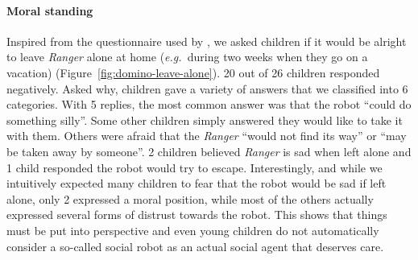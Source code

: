 \documentclass[letterpaper, 10pt, conference]{ieeeconf}
\newcommand{\eg}{{\textit{e.g.~}}}
\begin{document}
%

\vspace{1em}
\paragraph{Moral standing}

Inspired from the questionnaire used by \cite{kahn_jr._robotic_2006}, we asked
children if it would be alright to leave \emph{Ranger} alone at home (\eg during two
weeks when they go on a vacation) (Figure~\ref{fig:domino-leave-alone}). 
20 out of 26 children responded negatively. Asked why, children gave a
variety of answers that we classified into 6 categories. With 5 replies, the
most common answer was that the robot ``could do something silly''. Some other
children simply answered they would like to take it with them. Others were
afraid that the \emph{Ranger} ``would not find its way'' or ``may be taken away by
someone''. 2 children believed \emph{Ranger} is sad when left alone and 1 child
responded the robot would try to escape. Interestingly, and while we intuitively
expected many children to fear that the robot would be sad if left alone, only 2
expressed a moral position, while most of the others actually expressed several
forms of distrust towards the robot. This shows that things must
be put into perspective and even young children do not automatically consider a
so-called social robot as an actual social agent that deserves care.
\end{document}

